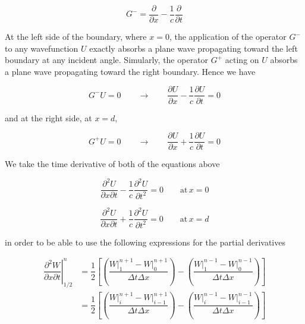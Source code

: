 \documentclass{article}
\begin{document}
\begin{equation}
G^- = \dfrac{\partial}{\partial x} - \dfrac{1}{c} \dfrac{\partial}{\partial t}
\end{equation}

At the left side of the boundary, where \(x=0\), the application of the
operator \(G^-\) to any wavefunction \(U\) exactly absorbs a plane wave
propagating toward the left boundary at any incident angle. Simularly,
the operator \(G^+\) acting on \(U\) absorbs a plane wave propagating
toward the right boundary. Hence we have

\begin{equation}
G^-U = 0 \qquad \longrightarrow \qquad \dfrac{\partial U}{\partial x} - \dfrac{1}{c} \dfrac{\partial U}{\partial t} = 0
\end{equation}

and at the right side, at \(x=d\),

\begin{equation}
G^+U = 0 \qquad \longrightarrow \qquad \dfrac{\partial U}{\partial x} + \dfrac{1}{c} \dfrac{\partial U}{\partial t} = 0
\end{equation}

We take the time derivative of both of the equations above

\begin{equation}
\dfrac{\partial^2 U}{\partial x \partial t} - \dfrac{1}{c} \dfrac{\partial^2 U}{\partial t^2} = 0 \qquad \mathrm{at} \, x = 0
\end{equation}

\begin{equation}
\dfrac{\partial^2 U}{\partial x \partial t} + \dfrac{1}{c} \dfrac{\partial^2 U}{\partial t^2} = 0 \qquad \mathrm{at} \, x = d
\end{equation}

in order to be able to use the following expressions for the partial
derivatives

\begin{align}
\left . \dfrac{\partial^2 W}{\partial x \partial t} \right |^n_{1/2} &= \dfrac{1}{2} \left [ \left( \dfrac{W \big|_{1}^{n+1} - W \big|_{0}^{n+1} }{\Delta t \Delta x} \right ) - \left( \dfrac{W \big|_{1}^{n-1} - W \big|_{0}^{n-1} }{\Delta t \Delta x} \right ) \right ] 
\\
&= \dfrac{1}{2} \left [ \left( \dfrac{W \big|_{i}^{n+1} - W \big|_{i-1}^{n+1} }{\Delta t \Delta x} \right ) - \left( \dfrac{W \big|_{i}^{n-1} - W \big|_{i-1}^{n-1} }{\Delta t \Delta x} \right ) \right ]
\end{align}
\end{document}
